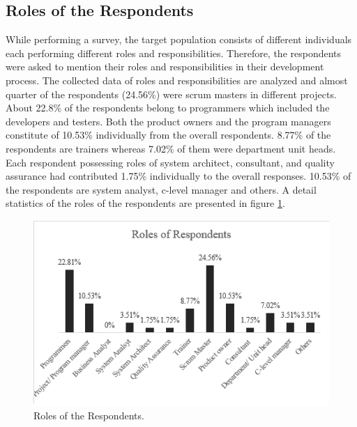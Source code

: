 \documentclass[a4paper,oneside]{bth}
\begin{document}
\subsection{Roles of the Respondents}
While performing a survey, the target population consists of different individuals each performing different roles and responsibilities. Therefore, the respondents were asked to mention their roles and responsibilities in their development process. The collected data of roles and responsibilities are analyzed and almost quarter of the respondents (24.56\%) were scrum masters in different projects. About 22.8\% of the respondents belong to programmers which included the developers and testers. Both the product owners and the program managers constitute of 10.53\% individually from the overall respondents. 8.77\% of the respondents are trainers whereas 7.02\% of them were department unit heads. Each respondent possessing roles of system architect, consultant, and quality assurance had contributed 1.75\% individually to the overall responses. 10.53\% of the respondents are system analyst, c-level manager and others. A detail statistics of the roles of the respondents are presented in figure \ref{roles}.
\begin{figure}[h]
\centering
\includegraphics[]{Roles of the respondents.png}
\caption{Roles of the Respondents.\label{roles}}
\end{figure}
\end{document}
